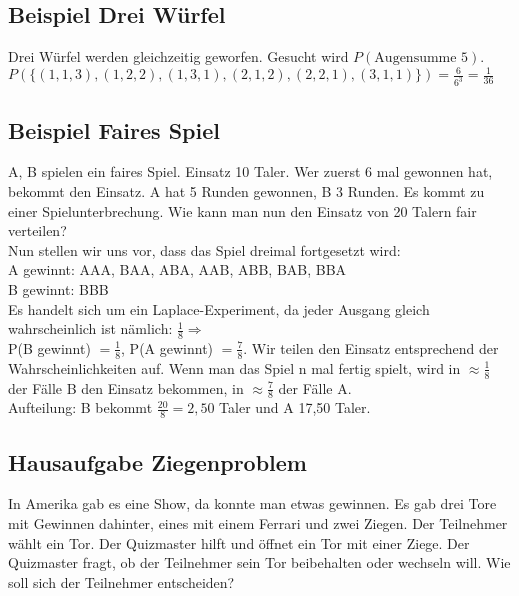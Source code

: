 \subsection{Beispiel Drei Würfel}
Drei Würfel werden gleichzeitig geworfen. Gesucht wird $P(\textrm{Augensumme 5})$.\\
$P(\{(1,1,3),(1,2,2),(1,3,1),(2,1,2),(2,2,1),(3,1,1) \})=\frac{6}{6^3}=\frac{1}{36}$

\subsection{Beispiel Faires Spiel}
A, B spielen ein faires Spiel. Einsatz 10 Taler. Wer zuerst 6 mal gewonnen hat, bekommt den Einsatz. A hat 5 Runden gewonnen, B 3 Runden. Es kommt zu einer Spielunterbrechung. Wie kann man nun den Einsatz von 20 Talern fair verteilen? \\
Nun stellen wir uns vor, dass das Spiel dreimal fortgesetzt wird:\\

A gewinnt: AAA, BAA, ABA, AAB, ABB, BAB, BBA\\
B gewinnt: BBB\\

Es handelt sich um ein Laplace-Experiment, da jeder Ausgang gleich wahrscheinlich ist nämlich: $\frac{1}{8} \Rightarrow$\\
P(B gewinnt) $=\frac{1}{8}$, P(A gewinnt) $=\frac{7}{8}$. Wir teilen den Einsatz entsprechend der Wahrscheinlichkeiten auf. Wenn man das Spiel n mal fertig spielt, wird in $\approx \frac{1}{8}$ der Fälle B den Einsatz bekommen, in $\approx \frac{7}{8}$ der Fälle A.\\

Aufteilung: B bekommt $\frac{20}{8} = 2,50$ Taler und A 17,50 Taler.

\subsection{Hausaufgabe Ziegenproblem}
In Amerika gab es eine Show, da konnte man etwas gewinnen. Es gab drei Tore mit Gewinnen dahinter, eines mit einem Ferrari und zwei Ziegen. Der Teilnehmer wählt ein Tor. Der Quizmaster hilft und öffnet ein Tor mit einer Ziege. Der Quizmaster fragt, ob der Teilnehmer sein Tor beibehalten oder wechseln will. Wie soll sich der Teilnehmer entscheiden? 